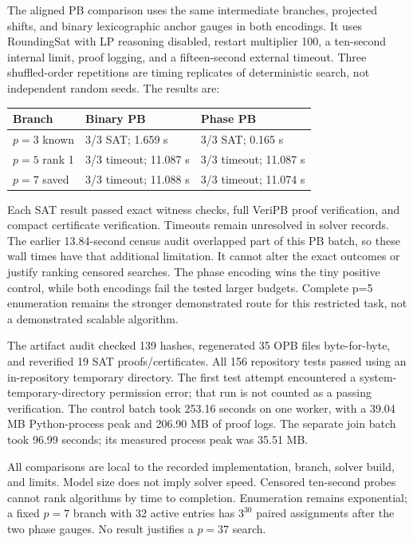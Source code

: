 \documentclass[11pt]{article}
\begin{document}
The aligned PB comparison uses the same intermediate branches, projected
shifts, and binary lexicographic anchor gauges in both encodings. It uses
RoundingSat with LP reasoning disabled, restart multiplier 100, a ten-second
internal limit, proof logging, and a fifteen-second external timeout.
Three shuffled-order repetitions are timing replicates of deterministic
search, not independent random seeds. The results are:
\begin{center}
\begin{tabular}{lll}
\toprule
Branch & Binary PB & Phase PB\\\midrule
$p=3$ known & 3/3 SAT; 1.659 s & 3/3 SAT; 0.165 s\\
$p=5$ rank 1 & 3/3 timeout; 11.087 s & 3/3 timeout; 11.087 s\\
$p=7$ saved & 3/3 timeout; 11.088 s & 3/3 timeout; 11.074 s\\
\bottomrule
\end{tabular}
\end{center}
Each SAT result passed exact witness checks, full VeriPB proof verification,
and compact certificate verification. Timeouts remain unresolved in solver
records. The earlier 13.84-second census audit overlapped part of this PB
batch, so these wall times have that additional limitation. It cannot alter
the exact outcomes or justify ranking censored searches. The phase encoding
wins the tiny positive control, while both encodings fail the tested larger
budgets. Complete p=5 enumeration remains the stronger demonstrated route
for this restricted task, not a demonstrated scalable algorithm.

The artifact audit checked 139 hashes, regenerated 35 OPB files byte-for-byte,
and reverified 19 SAT proofs/certificates. All 156 repository tests passed
using an in-repository temporary directory. The first test attempt encountered
a system-temporary-directory permission error; that run is not counted as a
passing verification. The control batch took 253.16 seconds on one worker,
with a 39.04 MB Python-process peak and 206.90 MB of proof logs.
The separate join batch took 96.99 seconds; its measured process peak was 35.51 MB.


All comparisons are local to the recorded implementation, branch, solver
build, and limits. Model size does not imply solver speed. Censored ten-second
probes cannot rank algorithms by time to completion. Enumeration remains
exponential; a fixed $p=7$ branch with 32 active entries has $3^{30}$ paired
assignments after the two phase gauges. No result justifies a $p=37$ search.
\end{document}
